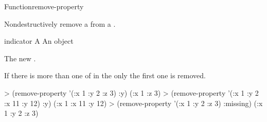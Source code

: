 \documentclass[10pt,twoside,english,pdftex]{article}
\begin{document}
\begin{functiondoc}{Function}{remove-property}{ 
  \returns{} } 
%
%
  
\fnsyntax

\fnpurpose Nondestructively remove a  from a
. 

\fnpackage {}

\fnmodule {}

\fnargs
\begin{args}{indicator}
\arg[plist] A 
\arg[indicator] An object
\end{args}

\fnreturns The new . 

\fndescription If there is more than one  of
 in the  only the first one is
removed.

\fnexamples
\begin{example}
> (remove-property '(:x 1 :y 2 :z 3) :y)
(:x 1 :z 3)
> (remove-property '(:x 1 :y 2 :x 11 :y 12) :y)
(:x 1 :x 11 :y 12)
> (remove-property '(:x 1 :y 2 :z 3) :missing)
(:x 1 :y 2 :z 3)
\end{example}

\end{functiondoc}

\end{document}
